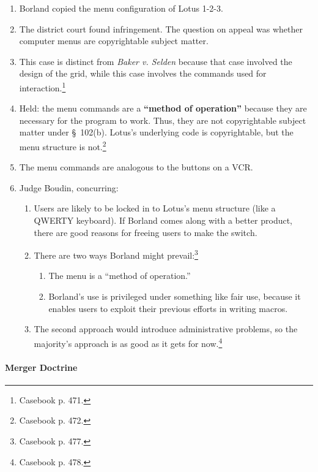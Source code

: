 \begin{enumerate}
    \item Borland copied the menu configuration of Lotus 1-2-3.
    \item The district court found infringement. The question on appeal was 
    whether computer menus are copyrightable subject matter.
    \item This case is distinct from \emph{Baker v. Selden} because that case 
    involved the design of the grid, while this case involves the commands 
    used for interaction.\footnote{Casebook p. 471.}
    \item Held: the menu commands are a \textbf{``method of operation''} 
    because they are necessary for the program to work. Thus, they are not 
    copyrightable subject matter under \S\ 102(b). Lotus's underlying code is 
    copyrightable, but the menu structure is not.\footnote{Casebook p. 472.}
    \item The menu commands are analogous to the buttons on a VCR.
    \item Judge Boudin, concurring:
    \begin{enumerate}
        \item Users are likely to be locked in to Lotus's menu structure (like 
        a QWERTY keyboard). If Borland comes along with a better product, 
        there are good reasons for freeing users to make the switch.
        \item There are two ways Borland might prevail:\footnote{Casebook p. 
        477.}
        \begin{enumerate}
            \item The menu is a ``method of operation.''
            \item Borland's use is privileged under something like fair use, 
            because it enables users to exploit their previous efforts in 
            writing macros.
        \end{enumerate}
        \item The second approach would introduce administrative problems, so 
        the majority's approach is as good as it gets for 
        now.\footnote{Casebook p. 478.}
    \end{enumerate}
\end{enumerate}

\paragraph{Merger Doctrine}

